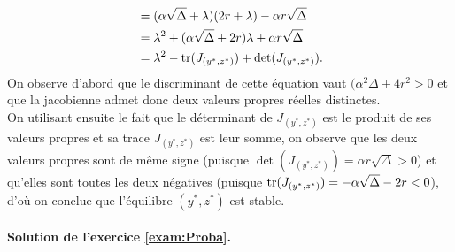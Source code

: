 \begin{enumerate}
\begin{align*}
    & = (\alpha \sqrt{\Delta} + \lambda) (2 r + \lambda) - \alpha r \sqrt{\Delta} \\
    & = \lambda^2 + (\alpha \sqrt{\Delta} + 2r) \lambda + \alpha r \sqrt{\Delta} \\
    & = \lambda^2 - \operatorname{tr}(J_{(y^*, z^*)}) + \det(J_{(y^*, z^*)}).
  \end{align*}
  On observe d'abord que le discriminant de cette équation vaut $(\alpha^2 \Delta + 4r^2 > 0$ et que la jacobienne admet donc deux valeurs propres réelles distinctes. \\
  On utilisant ensuite le fait que le déterminant de $J_{(y^*, z^*)}$ est le produit de ses valeurs propres et sa trace $J_{(y^*, z^*)}$ est leur somme, on observe que les deux valeurs propres sont de même signe (puisque $\det(J_{(y^*, z^*)}) = \alpha r \sqrt{\Delta} > 0$) et qu'elles sont toutes les deux négatives (puisque $\operatorname{tr}(J_{(y^*, z^*)}) = - \alpha \sqrt{\Delta} - 2r < 0$), d'où on conclue que l'équilibre $(y^*, z^*)$ est stable.
\end{enumerate}

\paragraph{Solution de l'exercice \ref{exam:Proba}.}

